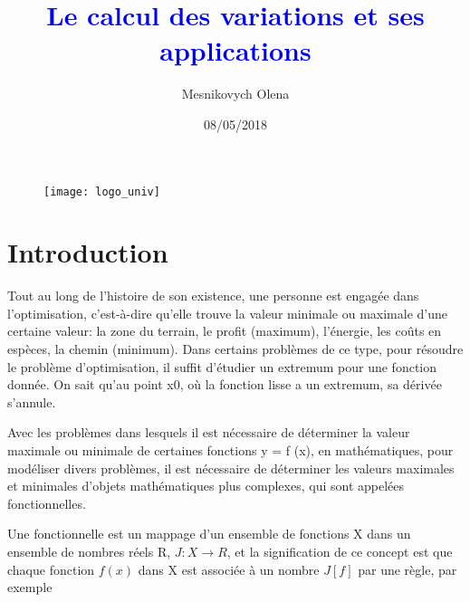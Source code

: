 \documentclass[11pt,a4paper]{report}%
\title{\textcolor{blue}{\textbf{Le calcul des variations et ses applications}}}
\author{Mesnikovych Olena}
\date{08/05/2018}
\begin{document}
\begin{figure}
	
	\texttt{[image: logo\_univ]}
	
\end{figure}


\maketitle



\tableofcontents

	\section{Introduction}
	
	
	
	Tout au long de l'histoire de son existence, une personne est engagée dans l'optimisation, c'est-à-dire qu'elle trouve la valeur minimale ou maximale d'une certaine valeur: la zone du terrain, le profit (maximum), l'énergie, les coûts en espèces, la chemin (minimum). Dans certains problèmes de ce type, pour résoudre le problème d'optimisation, il suffit d'étudier un extremum pour une fonction donnée. On sait qu'au point x0, où la fonction lisse a un extremum, sa dérivée s'annule.
	
	Avec les problèmes dans lesquels il est nécessaire de déterminer la valeur maximale ou minimale de certaines fonctions y = f (x), en mathématiques, pour modéliser divers problèmes, il est nécessaire de déterminer les valeurs maximales et minimales d'objets mathématiques plus complexes, qui sont appelées fonctionnelles.
	
	Une fonctionnelle est un mappage d'un ensemble de fonctions X dans un ensemble de nombres réels R, $ J: X\to R$, et la signification de ce concept est que chaque fonction $ f (x)$ dans X est associée à un nombre $J [f]$ par une règle, par exemple
	
\end{document}

